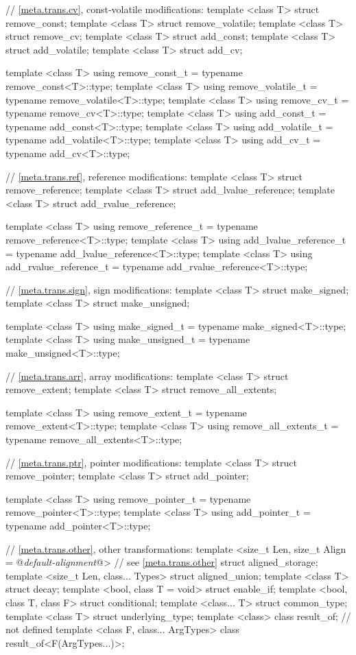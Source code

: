 \begin{codeblock}
{  // \ref{meta.trans.cv}, const-volatile modifications:
  template <class T> struct remove_const;
  template <class T> struct remove_volatile;
  template <class T> struct remove_cv;
  template <class T> struct add_const;
  template <class T> struct add_volatile;
  template <class T> struct add_cv;

  template <class T>
    using remove_const_t    = typename remove_const<T>::type;
  template <class T>
    using remove_volatile_t = typename remove_volatile<T>::type;
  template <class T>
    using remove_cv_t       = typename remove_cv<T>::type;
  template <class T>
    using add_const_t       = typename add_const<T>::type;
  template <class T>
    using add_volatile_t    = typename add_volatile<T>::type;
  template <class T>
    using add_cv_t          = typename add_cv<T>::type;

  // \ref{meta.trans.ref}, reference modifications:
  template <class T> struct remove_reference;
  template <class T> struct add_lvalue_reference;
  template <class T> struct add_rvalue_reference;

  template <class T>
    using remove_reference_t     = typename remove_reference<T>::type;
  template <class T>
    using add_lvalue_reference_t = typename add_lvalue_reference<T>::type;
  template <class T>
    using add_rvalue_reference_t = typename add_rvalue_reference<T>::type;

  // \ref{meta.trans.sign}, sign modifications:
  template <class T> struct make_signed;
  template <class T> struct make_unsigned;

  template <class T>
    using make_signed_t   = typename make_signed<T>::type;
  template <class T>
    using make_unsigned_t = typename make_unsigned<T>::type;

  // \ref{meta.trans.arr}, array modifications:
  template <class T> struct remove_extent;
  template <class T> struct remove_all_extents;

  template <class T>
    using remove_extent_t      = typename remove_extent<T>::type;
  template <class T>
    using remove_all_extents_t = typename remove_all_extents<T>::type;

  // \ref{meta.trans.ptr}, pointer modifications:
  template <class T> struct remove_pointer;
  template <class T> struct add_pointer;

  template <class T>
    using remove_pointer_t = typename remove_pointer<T>::type;
  template <class T>
    using add_pointer_t    = typename add_pointer<T>::type;

  // \ref{meta.trans.other}, other transformations:
  template <size_t Len,
            size_t Align = @\textit{default-alignment}@> // see \ref{meta.trans.other}
    struct aligned_storage;      
  template <size_t Len, class... Types> struct aligned_union;
  template <class T> struct decay;
  template <bool, class T = void> struct enable_if;
  template <bool, class T, class F> struct conditional;
  template <class... T> struct common_type;
  template <class T> struct underlying_type;
  template <class> class result_of;   // not defined
  template <class F, class... ArgTypes> class result_of<F(ArgTypes...)>;

}
\end{codeblock}
